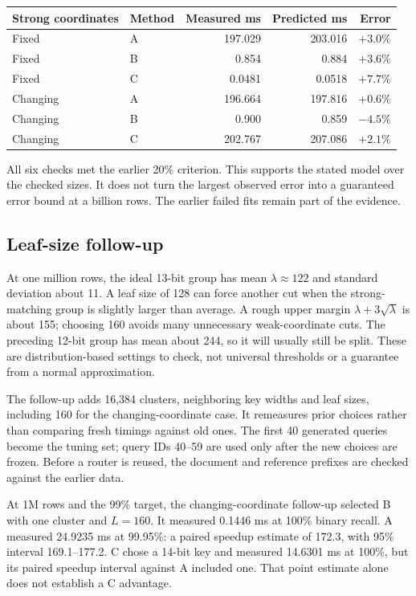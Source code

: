 \begin{center}\small
\begin{tabular}{@{}llrrr@{}}\toprule
Strong coordinates & Method & Measured ms & Predicted ms & Error\\\midrule
Fixed & A & 197.029 & 203.016 & $+3.0\%$\\
Fixed & B & 0.854 & 0.884 & $+3.6\%$\\
Fixed & C & 0.0481 & 0.0518 & $+7.7\%$\\
Changing & A & 196.664 & 197.816 & $+0.6\%$\\
Changing & B & 0.900 & 0.859 & $-4.5\%$\\
Changing & C & 202.767 & 207.086 & $+2.1\%$\\\bottomrule
\end{tabular}\normalsize\end{center}
All six checks met the earlier 20\% criterion. This supports the stated model over the checked
sizes. It does not turn the largest observed error into a guaranteed error bound at a billion
rows. The earlier failed fits remain part of the evidence.

\subsection{Leaf-size follow-up}
At one million rows, the ideal 13-bit group has mean $\lambda\approx122$ and standard deviation
about 11. A leaf size of 128 can force another cut when the strong-matching group is slightly
larger than average. A rough upper margin $\lambda+3\sqrt{\lambda}$ is about 155; choosing 160
avoids many unnecessary weak-coordinate cuts. The preceding 12-bit group has mean about 244,
so it will usually still be split. These are distribution-based settings to check, not universal
thresholds or a guarantee from a normal approximation.

The follow-up adds 16,384 clusters, neighboring key widths and leaf sizes, including
160 for the changing-coordinate case. It remeasures prior choices rather than comparing fresh
timings against old ones. The first 40 generated queries become the tuning set; query IDs
40--59 are used only after the new choices are frozen. Before a router is reused, the document and reference prefixes are checked against the earlier data.

At 1M rows and the 99\% target, the changing-coordinate follow-up selected B with one cluster
and $L=160$. It measured 0.1446 ms at 100\% binary recall. A measured 24.9235 ms at 99.95\%:
a paired speedup estimate of 172.3, with 95\% interval 169.1--177.2. C chose a 14-bit key and
measured 14.6301 ms at 100\%, but its paired speedup interval against A included one. That
point estimate alone does not establish a C advantage.

